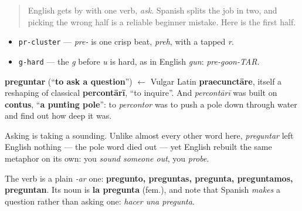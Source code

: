 \label{lesson:ES-C35-preguntar}



\begin{quote}
English gets by with one verb, \emph{ask}. Spanish splits the job in two, and picking the wrong half is a reliable beginner mistake. Here is the first half.
\end{quote}

\begin{sounds}
\begin{itemize}
\raggedright
  \item \texttt{pr-cluster} — \emph{pre-} is one crisp beat, \emph{preh}, with a tapped \emph{r}.
  \item \texttt{g-hard} — the \emph{g} before \emph{u} is hard, as in English \emph{gun}: \emph{pre-goon-TAR}.
\end{itemize}
\end{sounds}

\begin{cousinweb}
\textbf{preguntar} (\textquotedblleft{}\textbf{to ask a question}\textquotedblright{}) $\leftarrow$ Vulgar Latin \textbf{praecunctāre}, itself a reshaping of classical \textbf{percontārī}, \textquotedblleft{}to inquire\textquotedblright{}. And \emph{percontārī} was built on \textbf{contus}, \textquotedblleft{}\textbf{a punting pole}\textquotedblright{}: to \emph{percontor} was to push a pole down through water and find out how deep it was.

Asking is taking a sounding. Unlike almost every other word here, \emph{preguntar} left English nothing — the pole word died out — yet English rebuilt the same metaphor on its own: you \emph{sound someone out}, you \emph{probe}.

The verb is a plain \emph{-ar} one: \textbf{pregunto, preguntas, pregunta, preguntamos, preguntan}. Its noun is \textbf{la pregunta} (fem.), and note that Spanish \emph{makes} a question rather than asking one: \emph{hacer una pregunta}.
\end{cousinweb}

